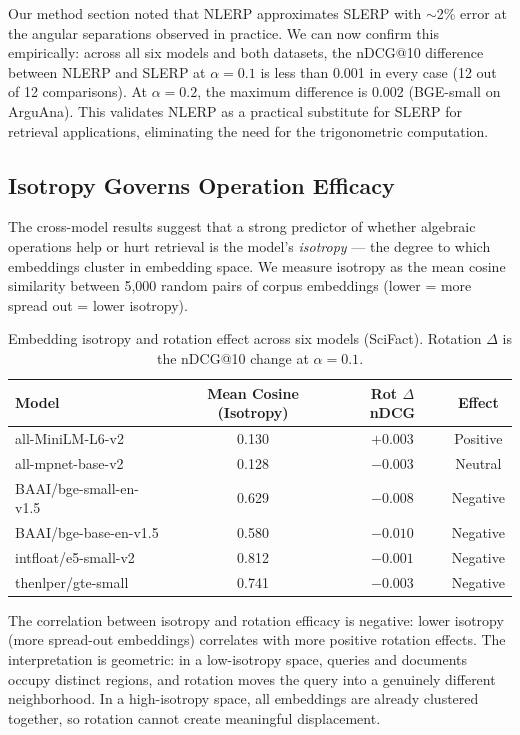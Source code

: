 \documentclass{article}
\begin{document}
Our method section noted that NLERP approximates SLERP with $\sim$2\% error at the angular separations observed in practice. We can now confirm this empirically: across all six models and both datasets, the nDCG@10 difference between NLERP and SLERP at $\alpha = 0.1$ is less than 0.001 in every case (12 out of 12 comparisons). At $\alpha = 0.2$, the maximum difference is 0.002 (BGE-small on ArguAna). This validates NLERP as a practical substitute for SLERP for retrieval applications, eliminating the need for the trigonometric computation.

\subsection{Isotropy Governs Operation Efficacy}
\label{sec:isotropy}

The cross-model results suggest that a strong predictor of whether algebraic operations help or hurt retrieval is the model's \emph{isotropy} --- the degree to which embeddings cluster in embedding space. We measure isotropy as the mean cosine similarity between 5,000 random pairs of corpus embeddings (lower = more spread out = lower isotropy).

\begin{table}[ht]
\centering
\caption{Embedding isotropy and rotation effect across six models (SciFact). Rotation $\Delta$ is the nDCG@10 change at $\alpha = 0.1$.}
\label{tab:isotropy}
\begin{tabular}{lccc}
\toprule
Model & Mean Cosine (Isotropy) & Rot $\Delta$ nDCG & Effect \\
\midrule
all-MiniLM-L6-v2 & 0.130 & $+0.003$ & Positive \\
all-mpnet-base-v2 & 0.128 & $-0.003$ & Neutral \\
BAAI/bge-small-en-v1.5 & 0.629 & $-0.008$ & Negative \\
BAAI/bge-base-en-v1.5 & 0.580 & $-0.010$ & Negative \\
intfloat/e5-small-v2 & 0.812 & $-0.001$ & Negative \\
thenlper/gte-small & 0.741 & $-0.003$ & Negative \\
\bottomrule
\end{tabular}
\end{table}

The correlation between isotropy and rotation efficacy is negative: lower isotropy (more spread-out embeddings) correlates with more positive rotation effects. The interpretation is geometric: in a low-isotropy space, queries and documents occupy distinct regions, and rotation moves the query into a genuinely different neighborhood. In a high-isotropy space, all embeddings are already clustered together, so rotation cannot create meaningful displacement.
\end{document}
